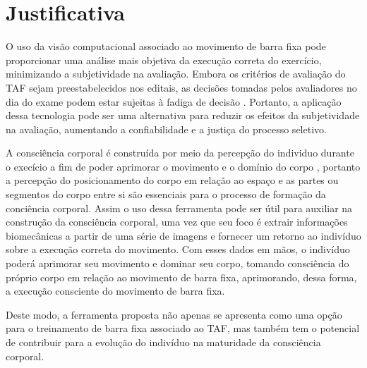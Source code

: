 \section{Justificativa}

O uso da visão computacional associado ao movimento de barra fixa pode proporcionar uma análise mais objetiva da execução correta do exercício, minimizando a subjetividade na avaliação. Embora os critérios de avaliação do \ac{TAF} sejam preestabelecidos nos editais, as decisões tomadas pelos avaliadores no dia do exame podem estar sujeitas à fadiga de decisão \cite{fadiga}. Portanto, a aplicação dessa tecnologia pode ser uma alternativa para reduzir os efeitos da subjetividade na avaliação, aumentando a confiabilidade e a justiça do processo seletivo.


A consciência corporal é construída por meio da percepção do individuo durante o execício a fim de poder aprimorar o movimento e o domínio do corpo \cite{consciencia},  portanto a percepção do posicionamento do corpo em relação ao espaço e as partes ou segmentos do corpo entre si são essenciais para o processo de formação da conciência corporal. Assim o uso dessa ferramenta pode ser útil para auxiliar na construção  da consciência corporal, uma vez que seu foco é extrair informações biomecânicas a partir de uma série de imagens e fornecer um retorno ao indivíduo sobre a execução correta do movimento. Com esses dados em mãos, o indivíduo poderá aprimorar seu movimento e dominar seu corpo, tomando consciência do próprio corpo em relação ao movimento de barra fixa, aprimorando, dessa forma, a execução consciente do movimento de barra fixa.



Deste modo, a ferramenta proposta não apenas se apresenta como uma opção para o treinamento de barra fixa associado ao \ac{TAF}, mas também tem o potencial de contribuir para a evolução do indivíduo na maturidade da consciência corporal.

